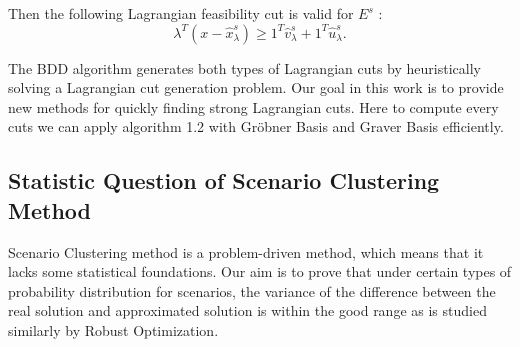 \documentclass{article}
\theoremstyle{plain}
\theoremstyle{definition}
\begin{document}
Then the following Lagrangian feasibility cut is valid for  $E^{s}$ :
$$\lambda^{T}\left(x-\hat{x}_{\lambda}^{s}\right) \geq 1^{T} \hat{v}_{\lambda}^{s}+1^{T} \hat{u}_{\lambda}^{s} .$$

The BDD algorithm generates both types of Lagrangian cuts by heuristically solving a Lagrangian cut generation problem. Our goal in this work is to provide new methods for quickly finding strong Lagrangian cuts. Here to compute every cuts we can apply algorithm 1.2 with Gröbner Basis and Graver Basis efficiently.


\subsection{Statistic Question of Scenario Clustering Method}

Scenario Clustering method is a problem-driven method, which means that it lacks some statistical foundations. Our aim is to prove that under certain types of probability distribution for scenarios, the variance of the difference between the real solution and approximated solution is within the good range as is studied similarly by Robust Optimization.
\end{document}
